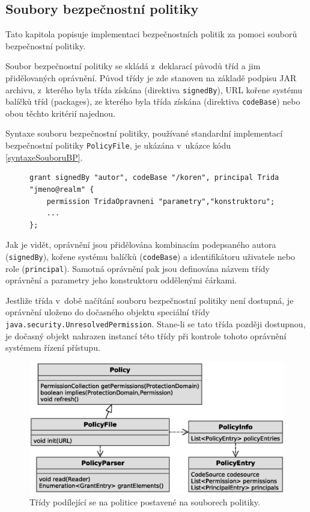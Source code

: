 \subsection{Soubory bezpečnostní politiky} \label{souboryBP}

Tato kapitola popisuje implementaci bezpečnostních politik za pomoci souborů bezpečnostní politiky.

Soubor bezpečnostní politiky se skládá z~deklarací původů tříd a jim přidělovaných oprávnění.
Původ třídy je zde stanoven na základě podpisu JAR archivu, z~kterého byla třída získána (direktiva {\tt signedBy}), URL kořene systému balíčků tříd (packages), ze kterého byla třída získána (direktiva {\tt codeBase}) nebo obou těchto kritérií najednou. \cite{oaks}

Syntaxe souboru bezpečnostní politiky, používané standardní implementací bezpečnostní politiky {\tt PolicyFile}, je ukázána v~ukázce kódu \ref{syntaxeSouboruBP}. \cite{oaks}\cite{refPolicyFiles}

\begin{figure}[tbh]
\begin{lstlisting}[caption=Syntaxe souboru bezpečnostní politiky, label=syntaxeSouboruBP]
grant signedBy "autor", codeBase "/koren", principal Trida "jmeno@realm" {
    permission TridaOpravneni "parametry","konstruktoru";
    ...
};
\end{lstlisting}
\end{figure}

Jak je vidět, oprávnění jsou přidělována kombinacím podepsaného autora ({\tt signedBy}), kořene systému balíčků ({\tt codeBase}) a identifikátoru uživatele nebo role ({\tt principal}).
Samotná oprávnění pak jsou definována názvem třídy oprávnění a parametry jeho konstruktoru oddělenými čárkami.

Jestliže třída v~době načítání souboru bezpečnostní politiky není dostupná, je oprávnění uloženo do dočasného objektu speciální třídy {\tt java.security.UnresolvedPermission}.
Stane-li se tato třída později dostupnou, je dočasný objekt nahrazen instancí této třídy při kontrole tohoto oprávnění systémem řízení přístupu. \cite{refUnresolvedPermission}

\begin{figure}[ht]
  \centering
  \includegraphics[width=12cm]{fig/policy-schema}
  \caption{Třídy podílející se na politice postavené na souborech politiky.}
  \label{tridyPolicyFile}
\end{figure}

